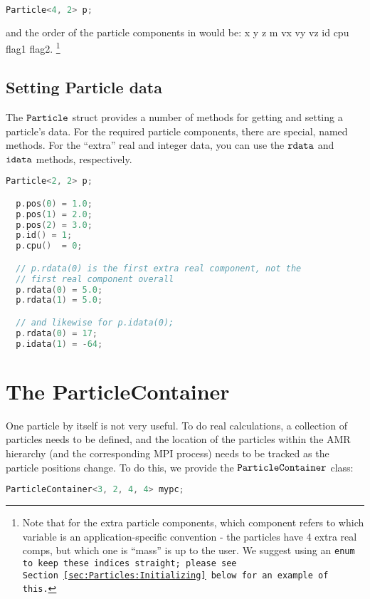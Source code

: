 \begin{lstlisting}[language=cpp]
  Particle<4, 2> p;
\end{lstlisting}

and the order of the particle components in would be: x y z m vx vy vz id cpu flag1 flag2. \footnote{Note that for the extra particle components, which component refers to which
variable is an application-specific convention - the particles have 4 extra real comps, but which one is ``mass'' is up to the user. We suggest using an \tt{enum} to keep these indices straight; please see Section~\ref{sec:Particles:Initializing} below for an example of this.} 

\subsection{Setting Particle data}

The $\tt{Particle}$ struct provides a number of methods for getting and setting a particle's data. For the required particle components, there are special, named methods. For the 
``extra'' real and integer data, you can use the $\tt{rdata}$ and $\tt{idata}$ methods, respectively. 

\begin{lstlisting}[language=cpp]
  Particle<2, 2> p;

  p.pos(0) = 1.0;
  p.pos(1) = 2.0;
  p.pos(2) = 3.0;
  p.id() = 1;
  p.cpu()  = 0;

  // p.rdata(0) is the first extra real component, not the 
  // first real component overall
  p.rdata(0) = 5.0;
  p.rdata(1) = 5.0;

  // and likewise for p.idata(0);
  p.rdata(0) = 17;
  p.idata(1) = -64;  
\end{lstlisting}

\section{The ParticleContainer}
\label{sec:Particles:ParticleContainer}
 
One particle by itself is not very useful. To do real calculations, a collection of particles needs to be defined, and the location of the particles within the AMR hierarchy
(and the corresponding MPI process) needs to be tracked as the particle positions change. To do this, we provide the $\tt{ParticleContainer}$ class:

\begin{lstlisting}[language=cpp]
  ParticleContainer<3, 2, 4, 4> mypc;
\end{lstlisting}
   
